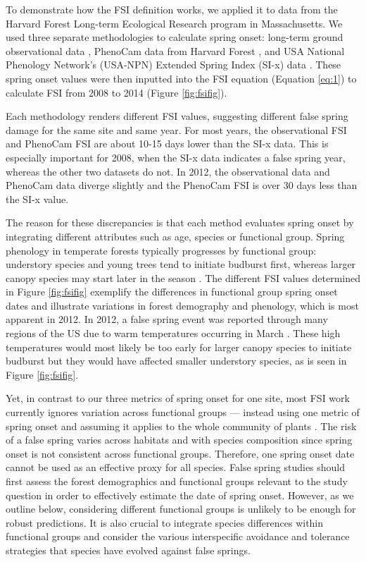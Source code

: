 \documentclass{article}\usepackage[]{graphicx}\usepackage[]{color}
\begin{document}
To demonstrate how the FSI definition works, we applied it to data from the Harvard Forest Long-term Ecological Research program in Massachusetts. We used three separate methodologies to calculate spring onset: long-term ground observational data \citep{Okeefe2014}, PhenoCam data from Harvard Forest \citep{Richardson2015}, and USA National Phenology Network's (USA-NPN) Extended Spring Index (SI-x) data \citep{USA-NPN2016}. These spring onset values were then inputted into the FSI equation (Equation \ref{eq:1}) to calculate FSI from 2008 to 2014 (Figure \ref{fig:fsifig}). 

Each methodology renders different FSI values, suggesting different false spring damage for the same site and same year. For most years, the observational FSI and PhenoCam FSI are about 10-15 days lower than the SI-x data. This is especially important for 2008, when the SI-x data indicates a false spring year, whereas the other two datasets do not. In 2012, the observational data and PhenoCam data diverge slightly and the PhenoCam FSI is over 30 days less than the SI-x value.

The reason for these discrepancies is that each method evaluates spring onset by integrating different attributes such as age, species or functional group. Spring phenology in temperate forests typically progresses by functional group: understory species and young trees tend to initiate budburst first, whereas larger canopy species may start later in the season \citep{Richardson2009, Xin2016}. The different FSI values determined in Figure \ref{fig:fsifig} exemplify the differences in functional group spring onset dates and illustrate variations in forest demography and phenology, which is most apparent in 2012. In 2012, a false spring event was reported through many regions of the US due to warm temperatures occurring in March \citep{Ault2015}. These high temperatures would most likely be too early for larger canopy species to initiate budburst but they would have affected smaller understory species, as is seen in Figure \ref{fig:fsifig}. 

Yet, in contrast to our three metrics of spring onset for one site, most FSI work currently ignores variation across functional groups --- instead using one metric of spring onset and assuming it applies to the whole community of plants \citep{Marino2011, Peterson2014, Allstadt2015, Mehdipoor2017}. The risk of a false spring varies across habitats and with species composition since spring onset is not consistent across functional groups. Therefore, one spring onset date cannot be used as an effective proxy for all species. False spring studies should first assess the forest demographics and functional groups relevant to the study question in order to effectively estimate the date of spring onset. However, as we outline below, considering different functional groups is unlikely to be enough for robust predictions. It is also crucial to integrate species differences within functional groups and consider the various interspecific avoidance and tolerance strategies that species have evolved against false springs. %
\end{document}
